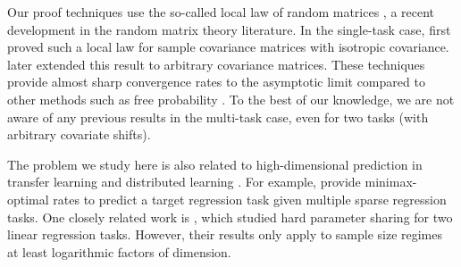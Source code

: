 \documentclass[aos,preprint]{imsart}
\begin{document}
Our proof techniques use the so-called local law of random matrices \cite{erdos2017dynamical}, a recent development in the random matrix theory literature.
In the single-task case, \cite{isotropic} first proved such a local law for sample covariance matrices with isotropic covariance.
\cite{Anisotropic} later extended this result to arbitrary covariance matrices.
These techniques provide almost sharp convergence rates to the asymptotic limit compared to other methods such as free probability \cite{nica2006lectures}.
To the best of our knowledge, we are not aware of any previous results in the multi-task case, even for two tasks (with arbitrary covariate shifts).

The problem we study here is also related to high-dimensional prediction in transfer learning \cite{li2020transfer,bastani2020predicting} and distributed learning \cite{dobriban2018high}.
For example, \cite{li2020transfer} provide minimax-optimal rates to predict a target regression task given multiple sparse regression tasks.
One closely related work is \cite{WZR20}, which studied hard parameter sharing for two linear regression tasks.
However, their results only apply to sample size regimes at least logarithmic factors of dimension.


\end{document}
